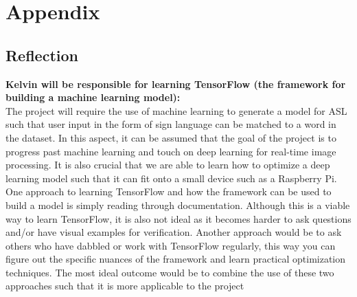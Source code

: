 \documentclass[12pt]{article}
\begin{document}
\newpage
\section{Appendix}
\subsection{Reflection}

\textbf{Kelvin will be responsible for learning TensorFlow (the framework for building a machine learning model):}\\
The project will require the use of machine learning to generate a model for ASL such that user input in the form of sign language
can be matched to a word in the dataset. In this aspect, it can be assumed that the goal of the project is to progress past machine
learning and touch on deep learning for real-time image processing. It is also crucial that we are able to learn how to optimize a deep
learning model such that it can fit onto a small device such as a Raspberry Pi. One approach to learning TensorFlow and how the framework
can be used to build a model is simply reading through documentation. Although this is a viable way to learn TensorFlow, it is also not
ideal as it becomes harder to ask questions and/or have visual examples for verification. Another approach would be to ask others who
have dabbled or work with TensorFlow regularly, this way you can figure out the specific nuances of the framework and learn practical
optimization techniques. The most ideal outcome would be to combine the use of these two approaches such that it is more applicable to the project\\
\end{document}
